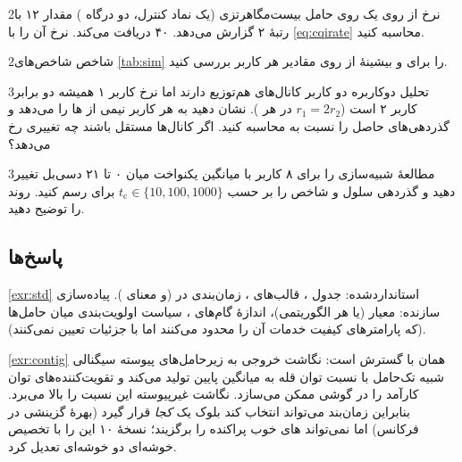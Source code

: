 \documentclass[11pt,a4paper]{article}
\begin{document}
\begin{exercisebox}{2}{نرخ از روی }\label{exr:cqi}
یک  روی حامل بیست‌مگاهرتزی (یک نماد کنترل، دو درگاه ) مقدار  ۱۲ با رتبهٔ ۲ گزارش
می‌دهد. ۴۰  دریافت می‌کند. نرخ آن را با \cref{eq:cqirate} محاسبه کنید.
\end{exercisebox}

\begin{exercisebox}{2}{شاخص }\label{exr:jain}
شاخص‌های  \cref{tab:sim} را برای  و بیشینهٔ  از روی مقادیر هر کاربر بررسی کنید.
\end{exercisebox}

\begin{exercisebox}{3}{تحلیل  دوکاربره}\label{exr:pf2}
دو کاربر کانال‌های هم‌توزیع دارند اما نرخ کاربر ۱ همیشه دو برابر کاربر ۲ است ($r_1 = 2r_2$ در هر ). نشان
دهید  به هر کاربر نیمی از ها را می‌دهد و گذردهی‌های حاصل را نسبت به  محاسبه کنید. اگر
کانال‌ها مستقل باشند چه تغییری رخ می‌دهد؟
\end{exercisebox}

\begin{exercisebox}{3}{مطالعهٔ شبیه‌سازی}\label{exr:sim}
 را برای ۸ کاربر با میانگین  یکنواخت میان ۰ تا ۲۱ دسی‌بل تغییر دهید و
گذردهی سلول و شاخص  را بر حسب $t_\mathrm{c}\in\{10,100,1000\}$ برای  رسم کنید. روند را توضیح دهید.
\end{exercisebox}

\subsection*{پاسخ‌ها}

\begin{solutionbox}{\ref{exr:std}}
استانداردشده: جدول ، قالب‌های ، زمان‌بندی  در  (و معنای ). پیاده‌سازی
سازنده: معیار  (یا هر الگوریتمی)، اندازهٔ گام‌های ، سیاست اولویت‌بندی میان حامل‌ها (که پارامترهای
کیفیت خدمات آن را محدود می‌کنند اما با جزئیات تعیین نمی‌کنند).
\end{solutionbox}

\begin{solutionbox}{\ref{exr:contig}}
 همان  با گسترش  است: نگاشت خروجی  به زیرحامل‌های پیوسته سیگنالی شبیه
تک‌حامل با نسبت توان قله به میانگین پایین تولید می‌کند و تقویت‌کننده‌های توان کارآمد را در گوشی ممکن می‌سازد.
نگاشت غیرپیوسته این نسبت را بالا می‌برد. بنابراین زمان‌بند می‌تواند انتخاب کند بلوک یک  \emph{کجا} قرار
گیرد (بهرهٔ گزینشی در فرکانس) اما نمی‌تواند های خوب پراکنده را برگزیند؛ نسخهٔ ۱۰ این را با تخصیص
خوشه‌ای دو خوشه‌ای تعدیل کرد.
\end{solutionbox}
\end{document}
